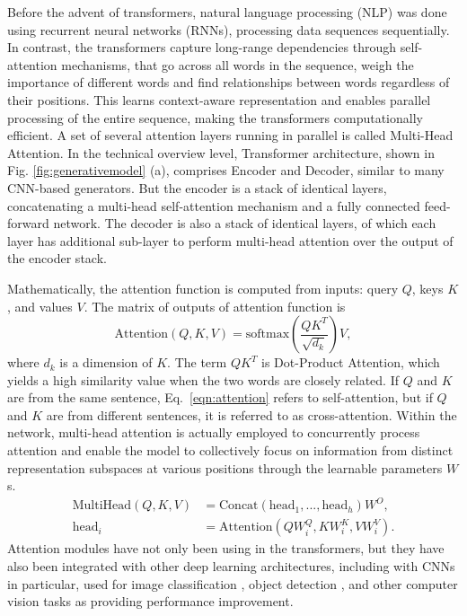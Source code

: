 \documentclass[11pt,a4paper]{article}
\begin{document}
Before the advent of transformers, natural language processing (NLP) was done using recurrent neural networks (RNNs), processing data sequences sequentially. In contrast, the transformers capture long-range dependencies through self-attention mechanisms, that go across all words in the sequence, weigh the importance of different words and find relationships between words regardless of their positions. This learns context-aware representation and enables parallel processing of the entire sequence, making the transformers computationally efficient. A set of several attention layers running in parallel is called Multi-Head Attention. In the technical overview level, Transformer architecture, shown in Fig. \ref{fig:generativemodel} (a), comprises Encoder and Decoder, similar to many CNN-based generators. But the encoder is a stack of identical layers, concatenating a multi-head self-attention mechanism and a fully connected feed-forward network. The decoder is also a stack of identical layers, of which each layer has additional sub-layer to perform multi-head attention over the output of the encoder stack.

Mathematically, the attention function is computed from inputs: query $Q$, keys $K$, and values $V$. The matrix of outputs of  attention function is
\begin{equation}
    \text{Attention}(Q, K, V ) = \text{softmax}(\frac{QK^T}{\sqrt{d_k}}) V,
    \label{eqn:attention}
\end{equation}
\noindent where $d_k$ is a  dimension of $K$. The term ${QK^T}$ is Dot-Product Attention, which yields a high similarity value when the two words are closely related.  If $Q$ and $K$ are from the same sentence, Eq.~\ref{eqn:attention} refers to self-attention, but if $Q$ and $K$ are from different sentences, it is referred to as cross-attention. Within the network, multi-head attention is actually employed to concurrently process attention and enable the model to collectively focus on information from distinct representation subspaces at various positions through the learnable parameters $W$s.
\begin{equation}
\begin{split}
        \text{MultiHead}(Q, K, V ) &= \text{Concat}(\text{head}_1, ..., \text{head}_h) W^O,\\
        \text{head}_i &= \text{Attention}(QW_i^Q, KW_i^K, VW_i^V ). 
\end{split}
\label{eqn:MultiHead}
\end{equation}
Attention modules have not only been using in the transformers, but they have also been integrated with other deep learning architectures, including with CNNs in particular, used for image classification \cite{Li:HAM:2022}, object detection \cite{Woo:CBAM:2018}, and other computer vision tasks \cite{Guo:Attention:2022} as providing performance improvement.
\end{document}
